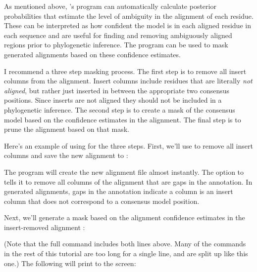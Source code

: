 As mentioned above, 's  program
can automatically calculate posterior probabilities that estimate the
level of ambiguity in the alignment of each residue. These can be
interpreted as how confident the model is in each aligned residue in
each sequence and are useful for finding and
removing ambiguously aligned regions prior to phylogenetic inference.
The  program can be used to mask
 generated alignments based on these confidence estimates.

I recommend a three step masking process. The first step is to remove
all insert columns from the alignment. Insert columns include residues
that are literally \emph{not aligned}, but rather just inserted in
between the appropriate two consensus positions. 
Since inserts are
not aligned they should not be included in a phylogenetic inference.
The second step is to create a mask of the consensus model based on
the confidence estimates in the alignment. The final step is to prune
the alignment based on that mask.

Here's an example of using  for the three steps. 
First, we'll use  to remove all insert columns and
save the new alignment to :



The program will create the new alignment file
 almost instantly.
The  option to  tells it to remove all
columns of the alignment that are gaps in the 
annotation. In  generated alignments, gaps in the
 annotation indicate a column is an insert column that
does not correspond to a consensus model position.

Next, we'll generate a mask based on the alignment confidence estimates
in the insert-removed alignment :


(Note that the full command includes both lines above. Many of the
commands in the rest of this tutorial are too long for a single line,
and are split up like this one.)
The following will print to the screen:

